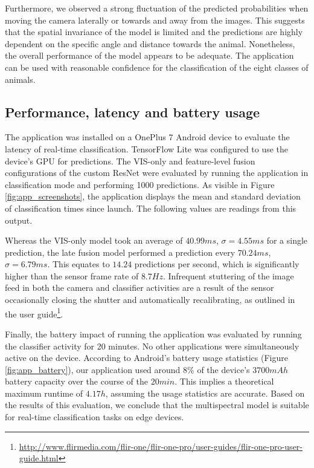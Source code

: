 \documentclass{l4proj}
\begin{document}
Furthermore, we observed a strong fluctuation of the predicted probabilities when moving the camera laterally or towards and away from the images. This suggests that the spatial invariance of the model is limited and the predictions are highly dependent on the specific angle and distance towards the animal. Nonetheless, the overall performance of the model appears to be adequate. The application can be used with reasonable confidence for the classification of the eight classes of animals.

\subsection{Performance, latency and battery usage}

The application was installed on a OnePlus 7 Android device to evaluate the latency of real-time classification. TensorFlow Lite was configured to use the device's GPU for predictions. The VIS-only and feature-level fusion configurations of the custom ResNet were evaluated by running the application in classification mode and performing 1000 predictions. As visible in Figure \ref{fig:app_screenshots}, the application displays the mean and standard deviation of classification times since launch. The following values are readings from this output.

Whereas the VIS-only model took an average of $40.99 ms$, $\sigma = 4.55 ms$ for a single prediction, the late fusion model performed a prediction every $70.24 ms$, $\sigma = 6.79 ms$. This equates to $14.24$ predictions per second, which is significantly higher than the sensor frame rate of $8.7 Hz$. 
Infrequent stuttering of the image feed in both the camera and classifier activities are a result of the sensor occasionally closing the shutter and automatically recalibrating, as outlined in the user guide\footnote{\url{http://www.flirmedia.com/flir-one/flir-one-pro/user-guides/flir-one-pro-user-guide.html}}.

Finally, the battery impact of running the application was evaluated by running the classifier activity for 20 minutes. No other applications were simultaneously active on the device. According to Android's battery usage statistics (Figure \ref{fig:app_battery}), our application used around $8\%$ of the device's $3700 mAh$ battery capacity over the course of the $20 min$. This implies a theoretical maximum runtime of $4.17 h$, assuming the usage statistics are accurate. Based on the results of this evaluation, we conclude that the multispectral model is suitable for real-time classification tasks on edge devices.
\end{document}
